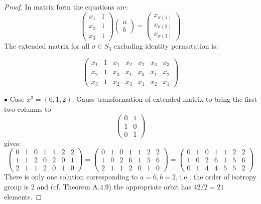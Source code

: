 \documentclass[11pt,a4paper]{article}
\begin{document}
{\begin{proof}
In matrix form the equations are:
$$
\left(\begin{array}{rr}
x_{1} & 1 \\
x_{2} & 1 \\
x_{3} & 1 
\end{array}\right)
\left(\begin{array}{r}
a \\
b 
\end{array}\right)=
\left(\begin{array}{r}
x_{\sigma(1)}  \\
x_{\sigma(2)}  \\
x_{\sigma(3)}  
\end{array}\right)
$$
The extended matrix for all $\sigma \in S_3$ excluding identity permutation is: 

$$
\left(\begin{array}{rr|rrrrr}
x_{1} & 1 & x_{1} & x_{2} & x_{2} & x_{3} & x_{3} \\
x_{2} & 1 & x_{3} & x_{1} & x_{3} & x_{1} & x_{2} \\
x_{3} & 1 & x_{2} & x_{3} & x_{1} & x_{2} & x_{1}
\end{array}\right)
$$
 \item[$\bullet$] Case $x^3=(0,1,2)$: Gauss transformation of extended matrix to bring the first two columns to 
$$
\left(\begin{array}{rr}
0 & 1 \\
1 & 0 \\
0 & 1 
\end{array}\right) 
$$
\rm gives:
$$
\left(\begin{array}{rrrrrrr}
0 & 1 & 0 & 1 & 1 & 2 & 2 \\
1 & 1 & 2 & 0 & 2 & 0 & 1 \\
2 & 1 & 1 & 2 & 0 & 1 & 0
\end{array}\right)=
\left(\begin{array}{rrrrrrr}
0 & 1 & 0 & 1 & 1 & 2 & 2 \\
1 & 0 & 2 & 6 & 1 & 5 & 6 \\
2 & 1 & 1 & 2 & 0 & 1 & 0
\end{array}\right)=
\left(\begin{array}{rrrrrrr}
0 & 1 & 0 & 1 & 1 & 2 & 2 \\
1 & 0 & 2 & 6 & 1 & 5 & 6 \\
0 & 1 & 4 & 4 & 5 & 5 & 2
\end{array}\right)
$$
There is only one solution corresponding to $a=6,b=2$, i.e., the order of isotropy group is $2$ and (cf. Theorem A.4.9) the appropriate orbit has $42/2=21$ elements.  


\end{proof}}
\end{document}
